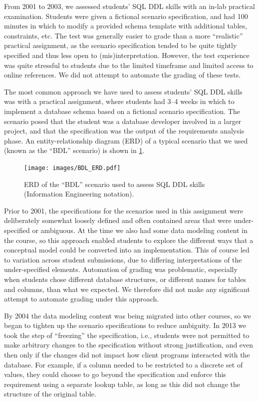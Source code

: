 \documentclass[sigconf, authordraft, capitalise]{acmart}
\begin{document}
From 2001 to 2003, we assessed students' SQL DDL skills with an in-lab practical examination. Students were given a fictional scenario specification, and had 100 minutes in which to modify a provided schema template with additional tables, constraints, etc. The test was generally easier to grade than a more ``realistic'' practical assignment, as the scenario specification tended to be quite tightly specified and thus less open to (mis)interpretation. However, the test experience was quite stressful to students due to the limited timeframe and limited access to online references. We did not attempt to automate the grading of these tests.

The most common approach we have used to assess students' SQL DDL skills was with a practical assignment, where students had 3--4 weeks in which to implement a database schema based on a fictional scenario specification. The scenario posed that the student was a database developer involved in a larger project, and that the specification was the output of the requirements analysis phase. An entity-relationship diagram (ERD) of a typical scenario that we used (known as the ``BDL'' scenario) is shown in \cref{fig-ERD}.
 
 
\begin{figure}[hb]
    \centering
    \texttt{[image: images/BDL\_ERD.pdf]} 
    \caption{ERD of the ``BDL'' scenario used to assess SQL DDL skills (Information Engineering notation).}
    \label{fig-ERD}
\end{figure}


Prior to 2001, the specifications for the scenarios used in this assignment were deliberately somewhat loosely defined and often contained areas that were under-specified or ambiguous. At the time we also had some data modeling content in the course, so this approach enabled students to explore the different ways that a conceptual model could be converted into an implementation. This of course led to variation across student submissions, due to differing interpretations of the under-specified elements. Automation of grading was problematic, especially when students chose different database structures, or different names for tables and columns, than what we expected. We therefore did not make any significant attempt to automate grading under this approach.

By 2004 the data modeling content was being migrated into other courses, so we began to tighten up the scenario specifications to reduce ambiguity. In 2013 we took the step of ``freezing'' the specification, i.e., students were not permitted to make arbitrary changes to the specification without strong justification, and even then only if the changes did not impact how client programs interacted with the database. For example, if a column needed to be restricted to a discrete set of values, they could choose to go beyond the specification and enforce this requirement using a separate lookup table, as long as this did not change the structure of the original table.
\end{document}
